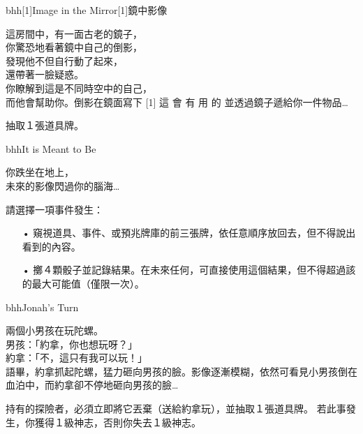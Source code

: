 \linebreak[0]%
\begin{EventCardSp}{bhh}{\scalebox{-1}[1]{Image in the Mirror}}{\scalebox{-1}[1]{鏡中影像}}
  \begin{CardStory}
    這房間中，有一面古老的鏡子，\\
    你驚恐地看著鏡中自己的倒影，\\
    發現他不但自行動了起來，\\
    還帶著一臉疑惑。\\
    你瞭解到這是不同時空中的自己，\\
    而他會幫助你。倒影在鏡面寫下\smallbreak
    \scalebox{-1}[1]{ \FontScript 這 \enskip 會 \enskip 有 \enskip 用 \enskip 的 }\smallbreak
    並透過鏡子遞給你一件物品…
\end{CardStory}
  抽取１張道具牌。\smallbreak
\end{EventCardSp}%
\linebreak[0]%
\begin{EventCard}{bhh}{It is Meant to Be}
  \begin{CardStory}
    你跌坐在地上，\\
    未來的影像閃過你的腦海…
  \end{CardStory}
  請選擇一項事件發生：
  \begin{itemize}
    \item[•] 窺視道具、事件、或預兆牌庫的前三張牌，依任意順序放回去，但不得說出看到的內容。
    \item[•] 擲４顆骰子並記錄結果。在未來任何\RollAny{}，可直接使用這個結果，但不得超過該\RollAny{}的最大可能值（僅限一次）。
  \end{itemize}
\end{EventCard}%
\linebreak[0]%
\begin{EventCard}{bhh}{Jonah's Turn}
  \begin{CardStory}
    兩個小男孩在玩陀螺。\\
    男孩：「約拿，你也想玩呀？」\\
    約拿：「不，這只有我可以玩！」\\
    語畢，約拿抓起陀螺，猛力砸向男孩的臉。影像逐漸模糊，依然可看見小男孩倒在血泊中，而約拿卻不停地砸向男孩的臉…
\end{CardStory}
  持有的探險者，必須立即將它丟棄（送給約拿玩），並抽取１張道具牌。\smallbreak
  若此事發生，你獲得１級神志，否則你失去１級神志。\smallbreak
\end{EventCard}%
\linebreak[0]%
